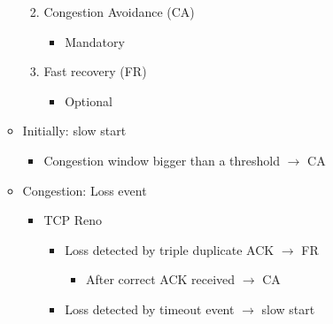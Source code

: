 \begin{itemize}
\begin{itemize}
\begin{enumerate}
\begin{itemize}
            \end{itemize}

          \item Congestion Avoidance (CA)

            \begin{itemize}

              \item Mandatory

            \end{itemize}

          \item Fast recovery (FR)

            \begin{itemize}

              \item Optional

            \end{itemize}

        \end{enumerate}

      \item Initially: slow start

        \begin{itemize}

          \item Congestion window bigger than a threshold $\to$ CA

        \end{itemize}

      \item Congestion: Loss event

        \begin{itemize}

          \item TCP Reno

            \begin{itemize}

              \item Loss detected by triple duplicate ACK $\to$ FR

                \begin{itemize}

                  \item After correct ACK received $\to$ CA

                \end{itemize}

              \item Loss detected by timeout event $\to$ slow start


\end{itemize}
\end{itemize}
\end{itemize}
\end{itemize}

